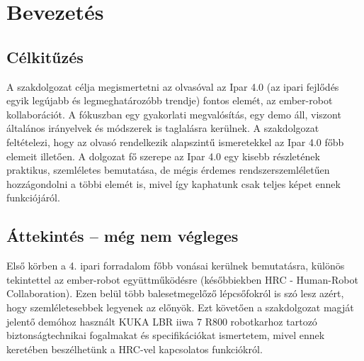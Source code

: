 \documentclass[../documentation.tex]{subfiles}
\begin{document}
\section{Bevezetés}
\subsection{Célkitűzés}
A szakdolgozat célja megismertetni az olvasóval az Ipar 4.0 (az ipari fejlődés egyik legújabb és legmeghatározóbb trendje) fontos elemét, az ember-robot kollaborációt. A fókuszban egy gyakorlati megvalósítás, egy demo áll, viszont általános irányelvek és módszerek is taglalásra kerülnek. A szakdolgozat feltételezi, hogy az olvasó rendelkezik alapszintű ismeretekkel az Ipar 4.0 főbb elemeit illetően. A dolgozat fő szerepe az Ipar 4.0 egy kisebb részletének praktikus, szemléletes bemutatása, de mégis érdemes rendszerszemléletűen hozzágondolni a többi elemét is, mivel így kaphatunk csak teljes képet ennek funkciójáról.

\subsection{Áttekintés -- még nem végleges}
Első körben a 4. ipari forradalom főbb vonásai kerülnek bemutatásra, különös tekintettel az ember-robot együttműködésre (későbbiekben HRC - \foreignlanguage{british}{Human-Robot Collaboration}). Ezen belül több balesetmegelőző lépcsőfokról is szó lesz azért, hogy szemléletesebbek legyenek az előnyök. Ezt követően a szakdolgozat magját jelentő demóhoz használt KUKA LBR iiwa 7 R800 robotkarhoz tartozó biztonságtechnikai fogalmakat és specifikációkat ismertetem, mivel ennek keretében beszélhetünk a HRC-vel kapcsolatos funkciókról.
\end{document}
